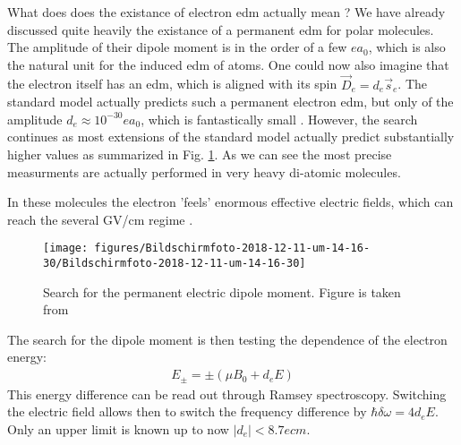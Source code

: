 \documentclass[10pt]{article}
\let\cite\citep
\providecommand\citep{\cite}
\begin{document}
What does does the existance of electron edm actually mean ? We have already discussed quite heavily the existance of a permanent edm for polar molecules. The amplitude of their dipole moment is in the order of a few $ea_0$, which is also the natural unit for the induced edm of atoms. One could now also imagine that the electron itself has an edm, which is aligned with its spin $\vec{D}_e = d_e \vec{s}_e$. The standard model actually predicts such a permanent electron edm, but only of the amplitude $d_e \approx 10^{-30}ea_0$, which is fantastically small . However, the search continues as most extensions of the standard model actually predict substantially higher values as summarized in Fig. \ref{421559}. As we can see the most precise measurments are actually performed in very heavy di-atomic molecules. 

In these molecules the electron 'feels' enormous effective electric fields, which can reach the several GV/cm regime \cite{Cairncross_2017}.
\begin{figure}[h!]
\begin{center}
\texttt{[image: figures/Bildschirmfoto-2018-12-11-um-14-16-30/Bildschirmfoto-2018-12-11-um-14-16-30]}
\caption{{Search for the permanent electric dipole moment. Figure is taken from
\protect\cite{experiment}
{\label{421559}}%
}}
\end{center}
\end{figure}

The search for the dipole moment is then testing the dependence of the electron energy:
\begin{align}
E_\pm  = \pm(\mu B_0 + d_e E)
\end{align}
This energy difference can be read out through Ramsey spectroscopy.  Switching the electric field allows then to switch the frequency difference by $\hbar \delta \omega = 4d_e E$. Only an upper limit is known up to now $|d_e|< 8.7 e cm$\cite{2013}.

\FloatBarrier


\end{document}
